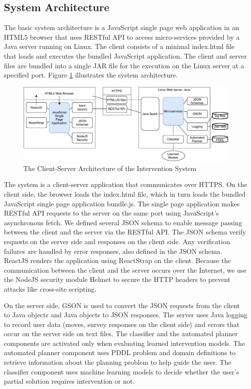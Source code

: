 \subsection*{System Architecture}
The basic system architecture is a JavaScript single page web application in an HTML5 browser that uses RESTful API to access micro-services provided by a Java server running on Linux. The client consists of a minimal index.html file that loads and executes the bundled JavaScript application. The client and server files are bundled into a single JAR file for the execution on the Linux server at a specified port. Figure \ref{fig:architecture} illustrates the system architecture.

\begin{figure}[!ht]
  \centering
\includegraphics[width=\columnwidth]{img/architecture.pdf}
  \caption{The Client-Server Architecture of the Intervention System}
  \label{fig:architecture}
\end{figure}
The system is a client-server application that communicates over HTTPS. On the client side, the browser loads the index.html file, which in turn loads the bundled JavaScript single page application bundle.js. The single page application makes RESTful API requests to the server on the same port using JavaScript's asynchronous fetch. We defined several JSON schema to enable message passing between the client and the server via the RESTful API. The JSON schema verify requests on the server side and responses on the client side. Any verification failures are handled by error responses, also defined in the JSON schema. ReactJS renders the application using ReactStrap on the client. Because the communication between the client and the server occurs over the Internet, we use the NodeJS security module Helmet to secure the HTTP headers to prevent attacks like cross-site scripting.

On the server side, GSON is used to convert the JSON requests from the client to Java objects and Java objects to JSON responses. The server uses Java logging to record user data (moves, survey responses on the client side) and errors that occur on the server side on text files. The classifier and the automated planner components are activated only when evaluating learned intervention models. The automated planner component uses PDDL problem and domain definitions to retrieve information about the planning problem to help guide the user. The classifier component uses machine learning models to decide whether the user's partial solution requires intervention or not.

